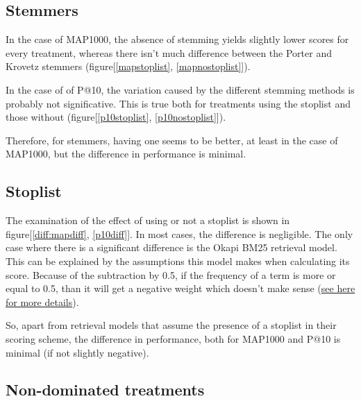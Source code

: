 \documentclass{article} %
\begin{document}
\subsection{Stemmers}

In the case of MAP1000, the absence of stemming yields slightly lower scores for every treatment, whereas there isn't much difference between the Porter and Krovetz stemmers (figure[\ref{mapstoplist}, \ref{mapnostoplist}]).\newline


In the case of of P@10, the variation caused by the different stemming methods is probably not significative. This is true both for treatments using the stoplist and those without (figure[\ref{p10stoplist}, \ref{p10nostoplist}]).

Therefore, for stemmers, having one seems to be better, at least in the case of MAP1000, but the difference in performance is minimal.


\subsection{Stoplist}

The examination of the effect of using or not a stoplist is shown in figure[\ref{diff:mapdiff}, \ref{p10diff}]. In most cases, the difference is negligible. The only case where there is a significant difference is the Okapi BM25 retrieval model. This can be explained by the assumptions this model makes when calculating its score. Because of the subtraction by 0.5, if the frequency of a term is more or equal to 0.5, than it will get a negative weight which doesn't make sense (\href{http://nlp.stanford.edu/IR-book/html/htmledition/okapi-bm25-a-non-binary-model-1.html}{see here for more details}).\newline

So, apart from retrieval models that assume the presence of a stoplist in their scoring scheme, the difference in performance, both for MAP1000 and P@10 is minimal (if not slightly negative).



\subsection{Non-dominated treatments}
\end{document}
